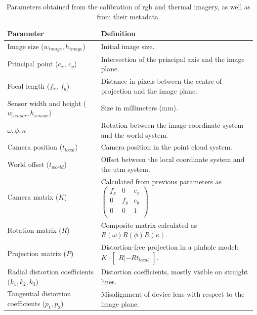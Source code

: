 \renewcommand{\arraystretch}{1.3}
\begin{table}[hbt]
    \small
    \caption{Parameters obtained from the calibration of \acrshort{rgb} and thermal imagery, as well as from their metadata.}
    \label{table:thermal_pc_attributes}
    \begin{tabular}{@{}l@{\hskip 0.55in}l@{}}
    \toprule
    Parameter & Definition\\
    \midrule
    Image size ($w_{\textit{image}}, h_{\textit{image}}$) & Initial image size.\\
    Principal point ($c_x$, $c_y$) & Intersection of the principal axis and the image plane. \\
    Focal length ($f_x$, $f_y$) & Distance in pixels between the centre of projection and the image plane. \\
    Sensor width and height ($w_{\textit{sensor}}, h_{\textit{sensor}}$) & Size in millimeters (\si{\milli\meter}). \\
    $\omega, \phi, \kappa$ & Rotation between the image coordinate system and the world system. \\
    Camera position ($t_{\textit{local}}$) & Camera position in the point cloud system.\\
    World offset ($t_{\textit{world}}$) & Offset between the local coordinate system and the \acrshort{utm} system.\\
    Camera matrix ($K$) & Calculated from previous parameters as $\begin{pmatrix} f_x & 0 & c_x\\ 0 & f_y & c_y\\ 0 & 0 & 1\\ \end{pmatrix}$ \\
    Rotation matrix ($R$) & Composite matrix calculated as $R(\omega)R(\phi)R(\kappa)$. \\
    Projection matrix ($P$) & Distortion-free projection in a pinhole model: $K \cdot \begin{bmatrix} R|-Rt_{\textit{local}} \end{bmatrix}$. \\
    Radial distortion coefficients ($k_1, k_2, k_3$) & Distortion coefficients, mostly visible on straight lines.\\
    Tangential distortion coefficients ($p_1, p_2$) & Misalignment of device lens with respect to the image plane. \\
    \bottomrule
    \end{tabular}
    \normalsize
\end{table}
\renewcommand{\arraystretch}{1}    

